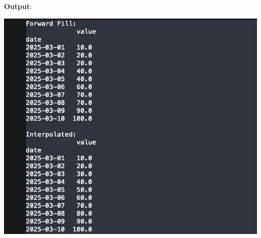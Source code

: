 \documentclass{article}
\begin{document}
\begin{itemize}
\begin{itemize}
\textbf{Output}:

\includegraphics[width=14cm,height=10
cm]{Missing_Output.png}
\end{itemize}
\end{itemize}
\end{document}
